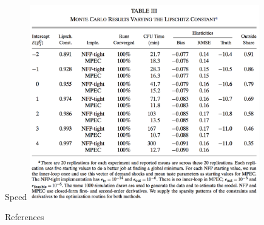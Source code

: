 \documentclass[english]{beamer}
\begin{document}
\begin{frame}{Speed}
\includegraphics[width=10cm]{dube-3.png}

\end{frame}

\begin{frame}[allowframebreaks]{References}

		
		
\end{frame}
\end{document}
